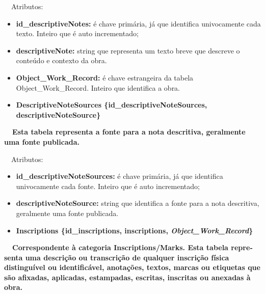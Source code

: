 \documentclass[letterpaper]{article}
\newcommand\textstyleStrongEmphasis[1]{\textbf{#1}}
\newcommand\liststyleLi{%
\renewcommand\labelitemi{{\textbullet}}
\renewcommand\labelitemii{[27A2?]}
\renewcommand\labelitemiii{{\textbullet}}
\renewcommand\labelitemiv{{\textbullet}}
}
\newcommand\liststyleLiii{%
\renewcommand\labelitemi{[27A2?]}
\renewcommand\labelitemii{[27A2?]}
\renewcommand\labelitemiii{[27A2?]}
\renewcommand\labelitemiv{[27A2?]}
}
\newcommand\liststyleLvi{%
\renewcommand\labelitemi{[27A2?]}
\renewcommand\labelitemii{[27A2?]}
\renewcommand\labelitemiii{[27A2?]}
\renewcommand\labelitemiv{[27A2?]}
}
\begin{document}
\bigskip

{
\ \ Atributos:}

\liststyleLvi
\begin{itemize}
\item {
\textbf{id\_}\textbf{descriptiveNotes}\textbf{:} \'e chave prim\'aria,
j\'a que identifica univocamente cada texto. Inteiro que \'e auto
incrementado;}
\item {
\textbf{descriptiveNote:} string que representa um texto breve que
descreve o conte\'udo e contexto da obra.}
\item {
\textbf{Object\_Work\_Record:}\textit{ }\'e chave estrangeira da tabela
Object\_Work\_Record. Inteiro que identifica a obra.}
\end{itemize}

\bigskip

\liststyleLi
\begin{itemize}
\item {\bfseries
DescriptiveNoteSources\textmd{
\{}\textmd{id\_descriptiveNoteSources}\textmd{,
descriptiveNoteSource\}}}
\end{itemize}
{\bfseries
\foreignlanguage{english}{\textmd{\ \ Esta
}}\textstyleStrongEmphasis{\foreignlanguage{english}{\textmd{tabela}}}\foreignlanguage{english}{\textmd{
representa a fonte para a nota descritiva, geralmente uma fonte
publicada.}}}


\bigskip

{
\ \ Atributos:}

\liststyleLiii
\begin{itemize}
\item {
\textbf{i}\textbf{d\_descriptiveNoteSources}\textbf{:} \'e chave
prim\'aria, j\'a que identifica univocamente cada fonte. Inteiro que
\'e auto incrementado;}
\item {
\textbf{descriptiveNoteSource:} string que identifica a fonte para a
nota descritiva, geralmente uma fonte publicada.}
\end{itemize}

\bigskip

\liststyleLi
\begin{itemize}
\item {\bfseries
Inscriptions\textmd{ \{}\textmd{id\_inscriptions}\textmd{, inscriptions,
}\textmd{\textit{Object\_Work\_Record}}\textmd{\}}}
\end{itemize}
{\bfseries
\foreignlanguage{english}{\textmd{\ \ Correspondente \`a categoria
}}\textstyleStrongEmphasis{\foreignlanguage{english}{Inscriptions/Marks}}\foreignlanguage{english}{\textmd{.
Esta
}}\textstyleStrongEmphasis{\foreignlanguage{english}{\textmd{tabela}}}\foreignlanguage{english}{\textmd{
representa uma descri\c{c}\~ao ou transcri\c{c}\~ao de qualquer
inscri\c{c}\~ao f\'isica distingu\'ivel ou identific\'avel,
anota\c{c}\~oes, textos, marcas ou etiquetas que s\~ao afixadas,
aplicadas, estampadas, escritas, inscritas ou anexadas \`a obra.}}}
\end{document}

